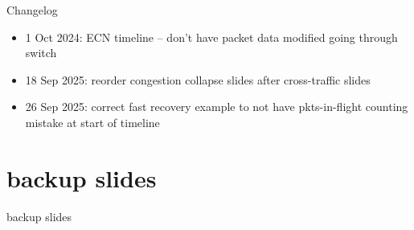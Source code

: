 \date{}
\title{}
\date{}
\usepackage{pgfplots}
\pgfplotsset{compat=1.16}

\begin{frame}
    \titlepage
\end{frame}

{\changelogmode
\begin{frame}{Changelog}
\begin{itemize}
\item 1 Oct 2024: ECN timeline -- don't have packet data modified going through switch
\item 18 Sep 2025: reorder congestion collapse slides after cross-traffic slides
\item 26 Sep 2025: correct fast recovery example to not have pkts-in-flight counting mistake at start of timeline
\end{itemize}
\end{frame}
}





\section{backup slides}
\begin{frame}{backup slides}
\end{frame}




